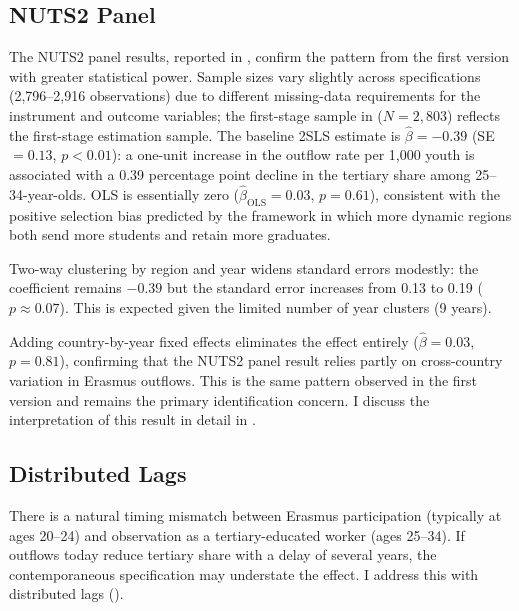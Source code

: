 \documentclass[12pt]{article}
\begin{document}
\subsection{NUTS2 Panel}

The NUTS2 panel results, reported in , confirm the pattern from the first version with greater statistical power. Sample sizes vary slightly across specifications (2,796--2,916 observations) due to different missing-data requirements for the instrument and outcome variables; the first-stage sample in  ($N = 2{,}803$) reflects the first-stage estimation sample. The baseline 2SLS estimate is $\hat{\beta} = -0.39$ (SE $= 0.13$, $p < 0.01$): a one-unit increase in the outflow rate per 1,000 youth is associated with a 0.39 percentage point decline in the tertiary share among 25--34-year-olds. OLS is essentially zero ($\hat{\beta}_{\text{OLS}} = 0.03$, $p = 0.61$), consistent with the positive selection bias predicted by the framework in which more dynamic regions both send more students and retain more graduates.



Two-way clustering by region and year widens standard errors modestly: the coefficient remains $-0.39$ but the standard error increases from 0.13 to 0.19 ($p \approx 0.07$). This is expected given the limited number of year clusters (9 years).

Adding country-by-year fixed effects eliminates the effect entirely ($\hat{\beta} = 0.03$, $p = 0.81$), confirming that the NUTS2 panel result relies partly on cross-country variation in Erasmus outflows. This is the same pattern observed in the first version and remains the primary identification concern. I discuss the interpretation of this result in detail in .

\subsection{Distributed Lags}

There is a natural timing mismatch between Erasmus participation (typically at ages 20--24) and observation as a tertiary-educated worker (ages 25--34). If outflows today reduce tertiary share with a delay of several years, the contemporaneous specification may understate the effect. I address this with distributed lags ().


\end{document}
